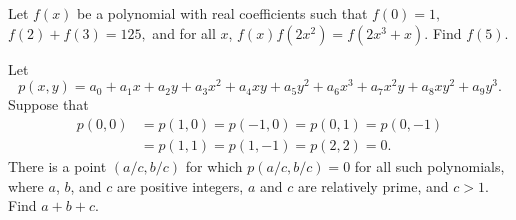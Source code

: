 %	
















\begin{question}[name={2007 AIME II, \href{https://artofproblemsolving.com/community/c4p798241}{Problem 14}}]
	Let $f(x)$ be a polynomial with real coefficients such that $f(0) = 1,$ $f(2)+f(3)=125,$ and for all $x$, $f(x)f(2x^{2})=f(2x^{3}+x).$ Find $f(5)$.
\end{question}


%	







\begin{question}[name={2008 AIME I, \href{https://artofproblemsolving.com/community/c4p1075365}{Problem 13}}]
	Let
	\[ p(x,y) = a_0 + a_1x + a_2y + a_3x^2 + a_4xy + a_5y^2 + a_6x^3 + a_7x^2y + a_8xy^2 + a_9y^3.
	\]Suppose that
	\begin{align*}p(0,0) &= p(1,0) = p( - 1,0) = p(0,1) = p(0, - 1) \\&= p(1,1) = p(1, - 1) = p(2,2) = 0.\end{align*}There is a point $ \left( {a}/{c}, {b}/{c}\right)$ for which $ p\left( {a}/{c}, {b}/{c}\right) = 0$ for all such polynomials, where $ a$, $ b$, and $ c$ are positive integers, $ a$ and $ c$ are relatively prime, and $ c > 1$. Find $ a + b + c$.
\end{question}


